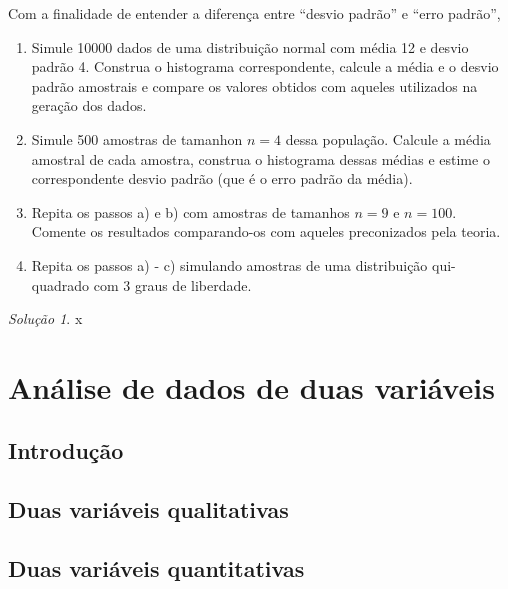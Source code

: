 \documentclass[
]{latex/krantz}
\providecommand{\tightlist}{%
  \setlength{\itemsep}{0pt}\setlength{\parskip}{0pt}}
\theoremstyle{definition}
\theoremstyle{definition}
\theoremstyle{definition}
\theoremstyle{definition}
\theoremstyle{remark}
\newtheorem*{solution}{Solução}
\begin{document}
Com a finalidade de entender a diferença entre ``desvio padrão'' e ``erro padrão'',

\begin{enumerate}
\def\labelenumi{\alph{enumi})}
\tightlist
\item
  Simule 10000 dados de uma distribuição normal com média 12 e desvio padrão 4. Construa o histograma correspondente, calcule a média e o desvio padrão amostrais e compare os valores obtidos com aqueles utilizados na geração dos dados.
\item
  Simule 500 amostras de tamanhon \(n = 4\) dessa população. Calcule a média amostral de cada amostra, construa o histograma dessas médias e estime o correspondente desvio padrão (que é o erro padrão da média).
\item
  Repita os passos a) e b) com amostras de tamanhos \(n = 9\) e \(n = 100\). Comente os resultados comparando-os com aqueles preconizados pela teoria.
\item
  Repita os passos a) - c) simulando amostras de uma distribuição qui-quadrado com 3 graus de liberdade.
\end{enumerate}

\begin{solution}
x
\end{solution}

\hypertarget{anuxe1lise-de-dados-de-duas-variuxe1veis}{%
\chapter{Análise de dados de duas variáveis}\label{anuxe1lise-de-dados-de-duas-variuxe1veis}}

\hypertarget{introduuxe7uxe3o-2}{%
\section{Introdução}\label{introduuxe7uxe3o-2}}

\hypertarget{duas-variuxe1veis-qualitativas}{%
\section{Duas variáveis qualitativas}\label{duas-variuxe1veis-qualitativas}}

\hypertarget{duas-variuxe1veis-quantitativas}{%
\section{Duas variáveis quantitativas}\label{duas-variuxe1veis-quantitativas}}
\end{document}
